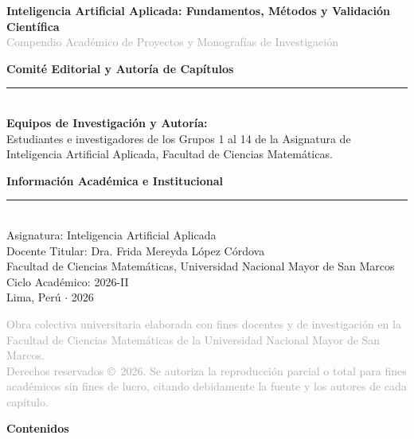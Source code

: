 \documentclass[12pt, a4paper]{article}
\begin{document}
\newpage
{} 
{}

\vspace*{0.5cm}
{\LARGE \textbf{Inteligencia Artificial Aplicada: Fundamentos, Métodos y Validación Científica}}\\[0.4cm]
{\large \textcolor{darkgray}{Compendio Académico de Proyectos y Monografías de Investigación}}

\vspace{1.0cm}
{\Large \textsf{\textbf{Comité Editorial y Autoría de Capítulos}}}\\[-0.2cm]
\textcolor{gray}{\rule{\textwidth}{0.8pt}}\\[0.3cm]
{\normalsize \textbf{Equipos de Investigación y Autoría:}}\\[0.1cm]
{\small Estudiantes e investigadores de los Grupos 1 al 14 de la Asignatura de Inteligencia Artificial Aplicada, Facultad de Ciencias Matemáticas.}

\vspace{1.0cm}
{\Large \textsf{\textbf{Información Académica e Institucional}}}\\[-0.2cm]
\textcolor{gray}{\rule{\textwidth}{0.8pt}}\\[0.3cm]
{\normalsize Asignatura: Inteligencia Artificial Aplicada}\\[0.1cm]
{\normalsize Docente Titular: Dra. Frida Mereyda López Córdova}\\[0.1cm]
{\normalsize Facultad de Ciencias Matemáticas, Universidad Nacional Mayor de San Marcos}\\[0.1cm]
{\normalsize Ciclo Académico: 2026-II}\\[0.1cm]
{\normalsize Lima, Perú $\cdot$ 2026}

\vfill
\noindent
{\small \textcolor{darkgray}{Obra colectiva universitaria elaborada con fines docentes y de investigación en la Facultad de Ciencias Matemáticas de la Universidad Nacional Mayor de San Marcos.}}\\[0.2cm]
{\small \textcolor{darkgray}{Derechos reservados \copyright~2026. Se autoriza la reproducción parcial o total para fines académicos sin fines de lucro, citando debidamente la fuente y los autores de cada capítulo.}}
\vspace{0.8cm}

\newpage
{} 
\vspace*{0.5cm}
{\Huge \textbf{Contenidos}}\\[0.6cm]
\end{document}
